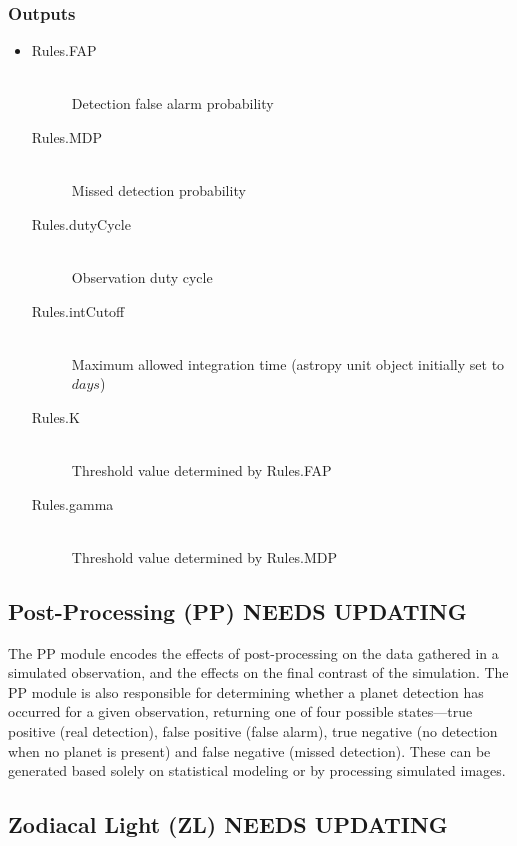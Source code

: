 \documentclass[cleanfoot]{asme2ej}
\begin{document}
\subsubsection*{Outputs}
\begin{itemize}
    \item
    \begin{description}
        \item[Rules.FAP] \hfill \\
        Detection false alarm probability
        \item[Rules.MDP] \hfill \\
        Missed detection probability
        \item[Rules.dutyCycle] \hfill \\
        Observation duty cycle
        \item[Rules.intCutoff] \hfill \\
        Maximum allowed integration time (astropy unit object initially set to $ days $)
        \item[Rules.K] \hfill \\
        Threshold value determined by Rules.FAP
        \item[Rules.gamma] \hfill \\
        Threshold value determined by Rules.MDP
    \end{description}
\end{itemize}


\subsection{Post-Processing (PP) NEEDS UPDATING}
The PP module encodes the effects of post-processing on the data gathered in a simulated observation, and the effects on the final contrast of the simulation.  The PP module is also responsible for determining whether a planet detection has occurred for a given observation, returning one of four possible states---true positive (real detection), false positive (false alarm), true negative (no detection when no planet is present) and false negative (missed detection).  These can be generated based solely on statistical modeling or by processing simulated images.
\label{sec:postprocessing}


\subsection{Zodiacal Light (ZL) NEEDS UPDATING}
\end{document}
